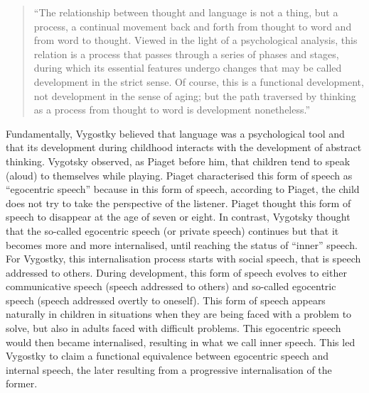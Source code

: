 \documentclass[a4paper,12pt,twoside,onecolumn,openright,final,oldfontcommands]{memoir}
\begin{document}
\begin{quote}
\enquote{The relationship between thought and language is not a thing, but a process, a continual movement back and forth from thought to word and from word to thought. Viewed in the light of a psychological analysis, this relation is a process that passes through a series of phases and stages, during which its essential features undergo changes that may be called development in the strict sense. Of course, this is a functional development, not development in the sense of aging; but the path traversed by thinking as a process from thought to word is development nonetheless.}
\end{quote}

Fundamentally, Vygostky believed that language was a psychological tool and that its development during childhood interacts with the development of abstract thinking. Vygotsky observed, as Piaget before him, that children tend to speak (aloud) to themselves while playing. Piaget characterised this form of speech as \enquote{egocentric speech} because in this form of speech, according to Piaget, the child does not try to take the perspective of the listener. Piaget thought this form of speech to disappear at the age of seven or eight. In contrast, Vygotsky thought that the so-called egocentric speech (or private speech) continues but that it becomes more and more internalised, until reaching the status of \enquote{inner} speech. For Vygostky, this internalisation process starts with social speech, that is speech addressed to others. During development, this form of speech evolves to either communicative speech (speech addressed to others) and so-called egocentric speech (speech addressed overtly to oneself). This form of speech appears naturally in children in situations when they are being faced with a problem to solve, but also in adults faced with difficult problems. This egocentric speech would then became internalised, resulting in what we call inner speech. This led Vygostky to claim a functional equivalence between egocentric speech and internal speech, the later resulting from a progressive internalisation of the former.
\end{document}
